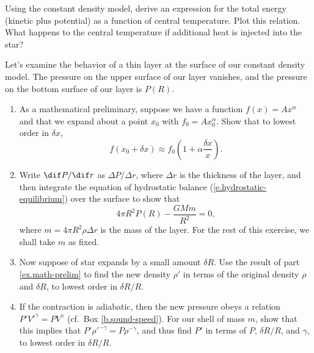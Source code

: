\begin{exercisebox}
\label{ex.gravithermal-specific-heat}
Using the constant density model, derive an expression for the total energy (kinetic plus potential) as a function of central temperature. Plot this relation.  What happens to the central temperature if additional heat is injected into the star?
\end{exercisebox}

\begin{exercisebox}
\label{ex.stellar-oscillation-period}
Let's examine the behavior of a thin layer at the surface of our constant density model. The pressure on the upper surface of our layer vanishes, and the pressure on the bottom surface of our layer is $P(R)$.

\begin{enumerate}
\item\label{ex.math-prelim}
As a mathematical preliminary, suppose we have a function $f(x) = Ax^{\alpha}$ and that we expand about a point $x_{0}$ with $f_{0} = Ax_{0}^{\alpha}$. Show that to lowest order in $\delta x$,
\[
	f(x_{0}+\delta x) \approx f_{0}\left( 1 + \alpha\frac{\delta x}{x} \right).
\]

\item
Write $\dif P/\dif r$ as $\Delta P/\Delta r$, where $\Delta r$ is the thickness of the layer, and then integrate the equation of hydrostatic balance (\ref{e.hydrostatic-equilibrium}) over the surface to show that
\begin{equation}\label{e.shell-pressure-balance}
	4\pi R^{2} P(R) - \frac{GMm}{R^{2}} = 0,
\end{equation}
where $m = 4\pi R^{2}\rho \Delta r$ is the mass of the layer. For the rest of this exercise, we shall take $m$ as fixed.

\item
Now suppose of star expands by a small amount $\delta R$. Use the result of part \ref{ex.math-prelim} to find the new density $\rho'$ in terms of the original density $\rho$ and $\delta R$, to lowest order in $\delta R/R$.

\item
If the contraction is adiabatic, then the new pressure obeys a relation $P' V'^{\gamma} = PV^{\gamma}$ (cf.\ Box \ref{b.sound-speed}). For our shell of mass $m$, show that this implies that $P'\rho'^{-\gamma} = P\rho^{-\gamma}$, and thus find $P'$ in terms of $P$, $\delta R/R$, and $\gamma$, to lowest order in $\delta R/R$.


\end{enumerate}
\end{exercisebox}
